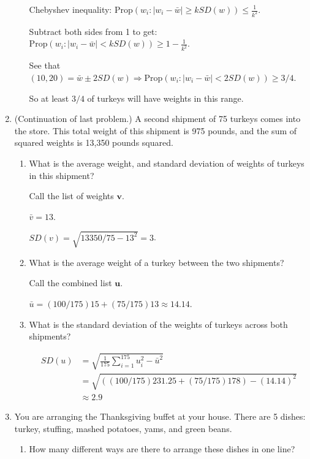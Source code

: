 \documentclass[11pt]{article}
\begin{document}
\begin{enumerate}
\begin{enumerate}
    {\color{red} Chebyshev inequality: $\mathrm{Prop}(w_i : |w_i - \bar w| \geq k SD(w)) \leq \frac{1}{k^2}$.

    Subtract both sides from 1 to get: $\mathrm{Prop}(w_i : |w_i - \bar w| < k SD(w)) \geq 1 - \frac{1}{k^2}$.

    See that $(10, 20) = \bar w \pm 2 SD(w) \Rightarrow \mathrm{Prop}(w_i : |w_i - \bar w| < 2 SD(w)) \geq 3/4$.

    So at least $3/4$ of turkeys will have weights in this range.}
\end{enumerate}

\item (Continuation of last problem.) A second shipment of 75 turkeys comes into the store. This total weight of this shipment is 975 pounds, and the sum of squared weights is 13,350 pounds squared.
\begin{enumerate}
    \item What is the average weight, and standard deviation of weights of turkeys in this shipment?

    {\color{red} Call the list of weights $\bm v$.

    $\bar v = 13$.

    $SD(v) = \sqrt{13350 / 75 - 13^2} = 3$.}

    \item What is the average weight of a turkey between the two shipments?

    {\color{red} Call the combined list $\bm u$.

    $\bar u = (100/175)15 + (75/175)13 \approx 14.14$.}

    \item What is the standard deviation of the weights of turkeys across both shipments? 

     {\color{red}

    \begin{align*}
        SD(u) &= \sqrt{\frac{1}{175}\sum_{i=1}^175 u_i^2 - \bar u^2}\\
              &= \sqrt{((100/175) 231.25 + (75/175) 178) - (14.14)^2}\\
              &\approx 2.9
    \end{align*}
    }
\end{enumerate}

\item You are arranging the Thanksgiving buffet at your house. There are 5 dishes: turkey, stuffing, mashed potatoes, yams, and green beans.
\begin{enumerate}
    \item How many different ways are there to arrange these dishes in one line? 


\end{enumerate}
\end{enumerate}
\end{document}
